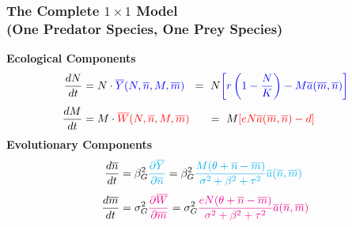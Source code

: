 \documentclass[10pt]{beamer}
\begin{document}
\begin{frame}
	\frametitle{The Complete $1\times1$ Model \\ (One Predator Species, One Prey Species)}
	{\bf Ecological Components}
	\begin{align*}
		\frac{dN}{dt} &= N\cdot {\color{blue}\overline{Y}(N, \overline{n}, M, \overline{m})}\ \ =\ N{\color{blue}\left[r\left(1 - \frac{N}{K}\right) - M\overline{a}(\overline{m}, \overline{n})\right]}\\[.1cm]
		\frac{dM}{dt} &= M\cdot {\color{red}\overline{W}(N, \overline{n}, M, \overline{m})}\ \ \ \ \ =\ M{\color{red}\left[eN\overline{a}(\overline{m}, \overline{n}) - d\right]}
	\end{align*}
	{\bf Evolutionary Components}
	\begin{align*}
		\frac{d\overline{n}}{dt} &= \beta_G^2{\color{cyan}\frac{\partial \overline{Y}}{\partial \overline{n}}} = \beta_G^2{\color{cyan}\frac{M(\theta + \overline{n} - \overline{m})}{\sigma^2 + \beta^2 + \tau^2} \overline{a}(\overline{n}, \overline{m})}\\[.1cm]
		\frac{d\overline{m}}{dt} &= \sigma_G^2{\color{magenta}\frac{\partial \overline{W}}{\partial \overline{m}}} = \sigma_G^2{\color{magenta}\frac{eN(\theta + \overline{n} - \overline{m})}{\sigma^2 + \beta^2 + \tau^2} \overline{a}(\overline{n}, \overline{m})}
	\end{align*}
\end{frame}
\end{document}
